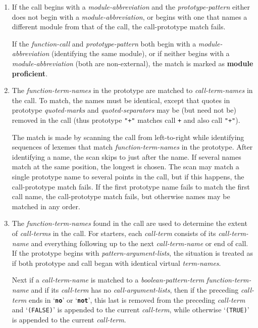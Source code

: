 \documentclass[12pt]{article}
\newcommand{\TT}[1]{{\tt \bfseries #1}}
\newcommand{\key}[1]{{\rm \bfseries #1}}
\begin{document}
\begin{enumerate}
\item\label{CALL-PROTOTYPE-MODULE-ABBREVIATION}
If the call begins with a {\em module-abbreviation}
and the {\em prototype-pattern}
either does not begin with a {\em module-abbreviation},
or begins with one that names a different module from that of the call,
the call-prototype match fails.

If the {\em function-call} and {\em prototype-pattern} both begin
with a {\em module-abbreviation} (identifying the same module), or
if neither begins with a {\em module-abbreviation} (both are non-external),
the match is marked as \key{module proficient}\label{MODULE-PROFICIENT}.

\item\label{CALL-PROTOTYPE-TERM-NAMES}
The {\em function-term-names} in the prototype are matched to
{\em call-term-names} in the call.  To match, the names must be identical,
except that quotes in prototype
{\em quoted-marks} and {\em quoted-separators} may be (but need not be)
removed in the call
(thus prototype {\tt "+"} matches call {\tt +} and also call {\tt "+"}).

The match is made by scanning the call from left-to-right
while identifying sequences of lexemes that match
{\em function-term-names} in the prototype.  After identifying
a name, the scan skips to just after the name.  If several
names match at the same position, the longest is chosen.
The scan may match a single prototype name to several points in the
call, but if this happens, the call-prototype match fails.
If the first prototype name fails to match the first call name,
the call-prototype match fails, but otherwise names may be matched
in any order.

\item\label{CALL-PROTOTYPE-CALL-TERMS}
The {\em function-term-names} found in the call are used to determine
the extent of {\em call-terms} in the call.  For starters, each
{\em call-term} consists of its {\em call-term-name} and everything
following up to the next {\em call-term-name} or end of call.
If the prototype begins
with {\em pattern-argument-lists}, the situation is treated as
if both prototype and call began with identical virtual
{\em term-names}.

Next if a {\em call-term-name} is matched to a {\em boolean-pattern-term}
{\em function-term-name} and if its {\em call-term} has no
{\em call-argument-lists}, then if the preceding {\em call-term}
ends in `\TT{no}' or `\TT{not}', this last is removed from the
preceding {\em call-term} and `{\tt (FALSE)}' is appended to the
current {\em call-term}, while otherwise `{\tt (TRUE)}' is appended to the
current {\em call-term}.


\end{enumerate}
\end{document}
